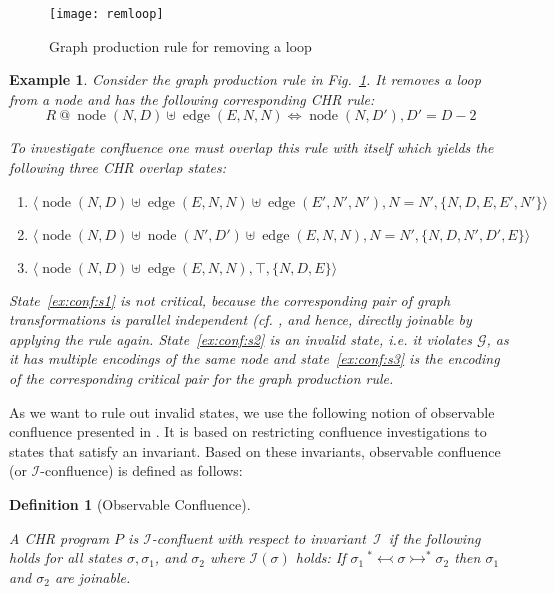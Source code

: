 \documentclass{tlp}
\newtheorem{example}{Example}[section]
\newtheorem{definition}{Definition}[section]
\newcommand{\st}[3]{\ensuremath{\langle #1 , #2 , #3 \rangle}}
\newcommand{\mcI}{\ensuremath{\mathcal{I}}}
\newcommand{\mcG}{\ensuremath{\mathcal{G}}}
\newcommand{\der}{\ensuremath{\rightarrowtail}}
\newcommand{\derrev}{\ensuremath{\ {}^*\!\!\leftarrowtail}}
\DeclareMathOperator{\node}{node}
\DeclareMathOperator{\edge}{edge}
\begin{document}
\begin{figure}
\texttt{[image: remloop]}
\caption{Graph production rule for removing a loop} 
\label{fig:remloop}
\end{figure}

\begin{example}\label{ex:confluence}
Consider the graph production rule in Fig.~\ref{fig:remloop}. It removes a
loop from a node and has the following corresponding CHR rule:\[
R\ @\ \node(N, D) \uplus \edge(E, N, N) \Leftrightarrow \node(N, D'), D'
= D-2\]

To investigate confluence one must overlap this rule with itself which yields the
following three CHR overlap states:
\begin{enumerate}
  \item \label{ex:conf:s1} $\st{\node(N,D) \uplus \edge(E,N,N) \uplus
  \edge(E',N',N')}{N = N'}{\{N,D,E,E',N'\}}$
  \item \label{ex:conf:s2} $\st{\node(N,D) \uplus \node(N',D') \uplus
  \edge(E,N,N)}{N=N'}{\{N,D,N',D',E\}}$
  \item \label{ex:conf:s3} $\st{\node(N,D) \uplus
  \edge(E,N,N)}{\top}{\{N,D,E\}}$
\end{enumerate}

State~\eqref{ex:conf:s1} is not critical, because the corresponding pair of graph
transformations is parallel independent (cf. \cite{ehrigprangetaentzer06}, and
hence, directly joinable by applying the rule again. State~\eqref{ex:conf:s2} is
an invalid state, i.e. it violates \mcG, as it has multiple encodings of the same
node and state~\eqref{ex:conf:s3} is the encoding of the corresponding critical
pair for the graph production rule.
\end{example}

As we want to rule out invalid states, we use the following notion of observable
confluence presented in \cite{duckstuckeysulzmann07}. It is based on restricting
confluence investigations to states that satisfy an invariant. Based on these
invariants, observable confluence (or \mcI-confluence) is defined as follows:

\begin{definition}[Observable Confluence]\label{def:obs_conf}

A CHR program $P$ is \mcI-confluent with respect to invariant~\mcI\ if the
following holds for all states $\sigma, \sigma_1$, and $\sigma_2$ where
$\mcI(\sigma)$ holds: If $\sigma_1 \derrev \sigma \der^* \sigma_2$ then
$\sigma_1$ and $\sigma_2$ are joinable.
\end{definition}
\end{document}
